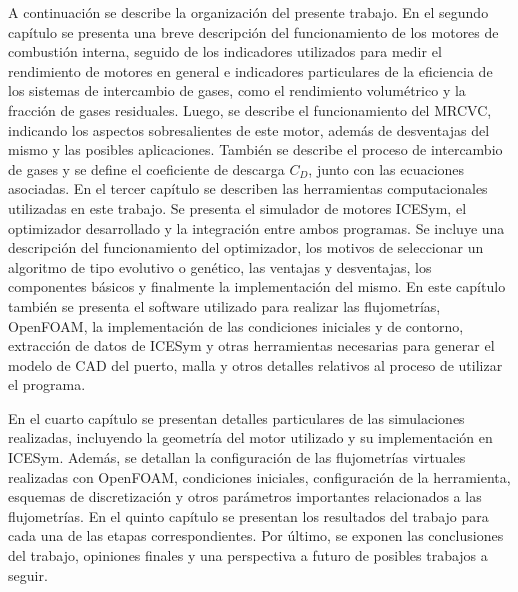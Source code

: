 %
A continuación se describe la organización del presente trabajo.
%
%
En el segundo capítulo se presenta una breve descripción del funcionamiento de
los motores de combustión interna, seguido de los indicadores utilizados para
medir el rendimiento de motores en general e indicadores particulares de la
eficiencia de los sistemas de intercambio de gases, como el rendimiento
volumétrico y la fracción de gases residuales.
%
Luego, se describe el funcionamiento del MRCVC, indicando los aspectos
sobresalientes de este motor, además de desventajas del mismo y las posibles
aplicaciones.
%
También se describe el proceso de intercambio de gases y se define el
coeficiente de descarga $C_{D}$, junto con las ecuaciones asociadas.
%
%
En el tercer capítulo se describen las herramientas computacionales utilizadas
en este trabajo.
%
Se presenta el simulador de motores ICESym, el optimizador desarrollado y
la integración entre ambos programas.
%
Se incluye una descripción del funcionamiento del optimizador, los motivos de
seleccionar un algoritmo de tipo evolutivo o genético, las ventajas y
desventajas, los componentes básicos y finalmente la implementación del mismo.
%
En este capítulo también se presenta el software utilizado para realizar las
flujometrías, OpenFOAM, la implementación de las condiciones iniciales y
de contorno, extracción de datos de ICESym y otras herramientas necesarias para
generar el modelo de CAD del puerto, malla y otros detalles relativos al proceso
de utilizar el programa.

%
En el cuarto capítulo se presentan detalles particulares de las simulaciones
realizadas, incluyendo la geometría del motor utilizado y su implementación en
ICESym.
%
Además, se detallan la configuración de las flujometrías virtuales realizadas
con OpenFOAM, condiciones iniciales, configuración de la herramienta, esquemas
de discretización y otros parámetros importantes relacionados a las
flujometrías.
%
%
En el quinto capítulo se presentan los resultados del trabajo para cada una de
las etapas correspondientes.
%
%
Por último, se exponen las conclusiones del trabajo, opiniones finales y una
perspectiva a futuro de posibles trabajos a seguir.
